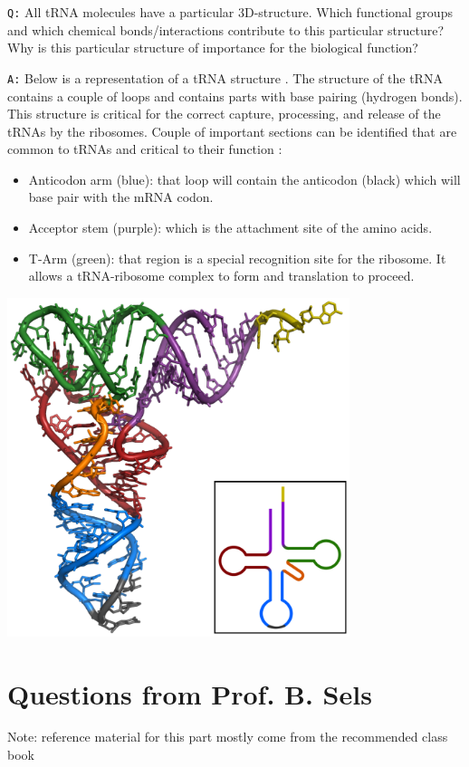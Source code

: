 \documentclass[11pt, a4paper,titlepage]{article}
\begin{document}
\texttt{Q:} All tRNA molecules have a particular 3D-structure. Which
functional groups and which chemical bonds/interactions contribute to
this particular structure? Why is this particular structure of
importance for the biological function?

\texttt{A:} Below is a representation of a tRNA structure
\cite{tRNA-Phe}. The structure of the tRNA contains a couple of loops
and contains parts with base pairing (hydrogen bonds). This structure
is critical for the correct capture, processing, and release of the
tRNAs by the ribosomes. Couple of important sections can be identified
that are common to tRNAs and critical to their function :

\begin{itemize}
\item Anticodon arm (blue): that loop will contain the anticodon (black)
  which will base pair with the mRNA codon.
\item Acceptor stem (purple): which is the attachment site of the amino
  acids.
\item T-Arm (green): that region is a special recognition site for the
  ribosome. It allows a tRNA-ribosome complex to form and translation
  to proceed.
\end{itemize}

\includegraphics[width=10cm]{./Figures/TRNA-Phe_yeast.png}
\section{Questions from Prof. B. Sels}
\label{sec-2}

Note: reference material for this part mostly come from the
recommended class book \cite{BioChemBlei}
\end{document}
